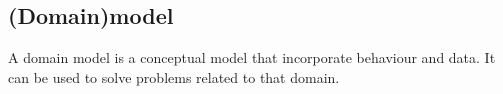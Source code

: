 \subsection{(Domain)model}
A domain model is a conceptual model that incorporate behaviour and data. It can be used to solve problems related to that domain.